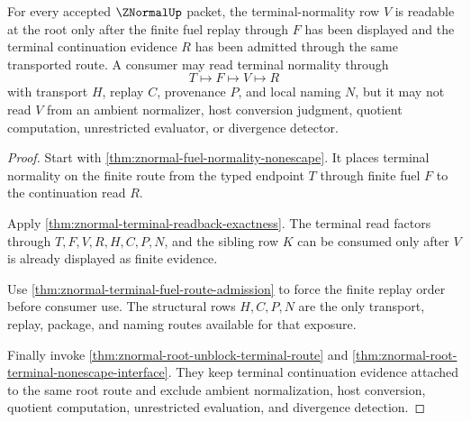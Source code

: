\begin{theorem}
\label{thm:znormal-root-terminal-normality-exposure}
For every accepted $\ZNormalUp$ packet, the terminal-normality row $V$ is readable at the root only after the finite fuel replay through $F$ has been displayed and the terminal continuation evidence $R$ has been admitted through the same transported route. A consumer may read terminal normality through
$$
T \longmapsto F \longmapsto V \longmapsto R
$$
with transport $H$, replay $C$, provenance $P$, and local naming $N$, but it may not read $V$ from an ambient normalizer, host conversion judgment, quotient computation, unrestricted evaluator, or divergence detector.
\end{theorem}
\begin{proof}
Start with \autoref{thm:znormal-fuel-normality-nonescape}. It places terminal normality on the finite route from the typed endpoint $T$ through finite fuel $F$ to the continuation read $R$.

Apply \autoref{thm:znormal-terminal-readback-exactness}. The terminal read factors through $T,F,V,R,H,C,P,N$, and the sibling row $K$ can be consumed only after $V$ is already displayed as finite evidence.

Use \autoref{thm:znormal-terminal-fuel-route-admission} to force the finite replay order before consumer use. The structural rows $H,C,P,N$ are the only transport, replay, package, and naming routes available for that exposure.

Finally invoke \autoref{thm:znormal-root-unblock-terminal-route} and \autoref{thm:znormal-root-terminal-nonescape-interface}. They keep terminal continuation evidence attached to the same root route and exclude ambient normalization, host conversion, quotient computation, unrestricted evaluation, and divergence detection.
\end{proof}

